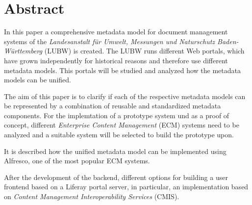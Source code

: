 \section{Abstract}
In this paper a comprehensive metadata model for document management systems of the \emph{Landesanstalt f\"ur Umwelt, Messungen und Naturschutz Baden-W\"urttemberg} (LUBW) is created. The LUBW runs different Web portals, which have grown independently for historical reasons and therefore use different metadata models. This portals will be studied and analyzed how the metadata models can be unified.

The aim of this paper is to clarify if each of the respective metadata models can be represented by a combination of reusable and standardized metadata components. For the implemtation of a prototype system und as a proof of concept, different \emph{Enterprise Content Management} (ECM) systems need to be analyzed and a suitable system will be selected to build the prototype upon.

It is described how the unified metadata model can be implemented using Alfresco, one of the most popular ECM systems. 

After the development of the backend, different options for building a user frontend based on a Liferay portal server, in particular, an implementation based on \emph{Content Management Interoperability Services} (CMIS).

